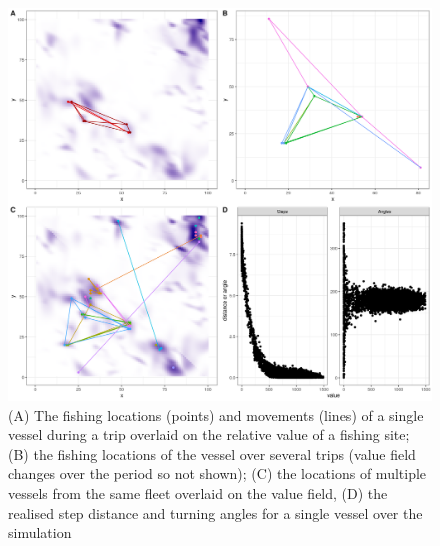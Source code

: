 \documentclass[review]{elsarticle}
\begin{document}
\begin{figure}[!ht]
	\includegraphics[width = \linewidth]{Plots/Combined_Movement}
	\caption{(A) The fishing locations (points) and movements (lines) of a
	single vessel during a trip overlaid on the relative value of a fishing
	site; (B) the fishing locations of the vessel over several trips (value
field changes over the period so not shown); (C) the locations of multiple
vessels from the same fleet overlaid on the value field, (D) the realised step
distance and turning angles for a single vessel over the simulation}
	\label{fig:mv}
\end{figure}	
\end{document}
